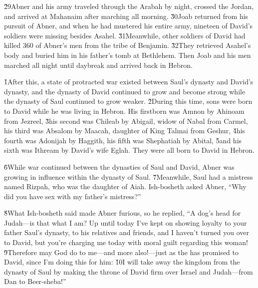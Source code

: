 \v{29}Abner and his army traveled through the Arabah by night, crossed the Jordan, and arrived at Mahanaim after marching all morning. \v{30}Joab returned from his pursuit of Abner, and when he had mustered his entire army, nineteen of David's soldiers were missing besides Asahel. \v{31}Meanwhile, other soldiers of David had killed 360 of Abner's men from the tribe of Benjamin. \v{32}They retrieved Asahel's body and buried him in his father's tomb at Bethlehem. Then Joab and his men marched all night until daybreak and arrived back in Hebron.

\v{1}After this, a state of protracted war existed between Saul's dynasty and David's dynasty, and the dynasty of David continued to grow and become strong while the dynasty of Saul continued to grow weaker. \v{2}During this time, sons were born to David while he was living in Hebron. His firstborn was Amnon by Ahinoam from Jezreel, \v{3}his second was Chileab by Abigail, widow of Nabal from Carmel, his third was Absalom by Maacah, daughter of King Talmai from Geshur, \v{4}his fourth was Adonijah by Haggith, his fifth was Shephatiah by Abital, \v{5}and his sixth was Ithream by David's wife Eglah. They were all born to David in Hebron.

\v{6}While war continued between the dynasties of Saul and David, Abner was growing in influence within the dynasty of Saul. \v{7}Meanwhile, Saul had a mistress named Rizpah, who was the daughter of Aiah. Ish-bosheth asked Abner, ``Why did you have sex with my father's mistress?''

\v{8}What Ish-bosheth said made Abner furious, so he replied, ``A dog's head for Judah---is that what I am? Up until today I've kept on showing loyalty to your father Saul's dynasty, to his relatives and friends, and I haven't turned you over to David, but you're charging me today with moral guilt regarding this woman! \v{9}Therefore may God do to me---and more also!---just as the  has promised to David, since I'm doing this for him: \v{10}I will take away the kingdom from the dynasty of Saul by making the throne of David firm over Israel and Judah---from Dan to Beer-sheba!''

